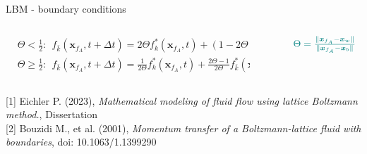 \documentclass[aspectratio=169,xcolor=dvipsnames]{beamer}
\begin{document}
\begin{frame}{LBM - boundary conditions}
\begin{columns}
\begin{column}{.63\textwidth}
			$\begin{aligned}
				& \Theta<\frac{1}{2}: \ \ f_{\bar{k}}\left(\boldsymbol{x}_{f_A}, t+\Delta t\right)=2 \Theta f_k^*\left(\boldsymbol{x}_{f_A}, t\right)+(1-2 \Theta) f_k^*\left(\boldsymbol{x}_{f_B}, t\right) \\
				& \Theta \geq \frac{1}{2}: \ \ f_{\bar{k}}\left(\boldsymbol{x}_{f_A}, t+\Delta t\right)=\frac{1}{2 \Theta} f_k^*\left(\boldsymbol{x}_{f_A}, t\right)+\frac{2 \Theta-1}{2 \Theta} f_{\bar{k}}^*\left(\boldsymbol{x}_{f_A}, t\right)
			\end{aligned}$
		\end{column}
		\begin{column}{.25\textwidth}
			\begin{figure}
				$ \color{teal}
				\Theta=\frac{{\parallel}\boldsymbol{x}_{f_A}-\boldsymbol{x}_w {\parallel}}{{\parallel}\boldsymbol{x}_{f_A}-\boldsymbol{x}_b{\parallel}}$
			\end{figure}
		\end{column}%
	\end{columns}
	\vspace{3.5mm}
	\tiny{[1] Eichler P. (2023)}, \textit{Mathematical modeling of fluid flow using lattice Boltzmann
		method.}, Dissertation\\
	\tiny{[2] Bouzidi M., et al. (2001), \textit{Momentum transfer of a Boltzmann-lattice fluid with boundaries},  doi: 10.1063/1.1399290}

\end{frame}
\end{document}
